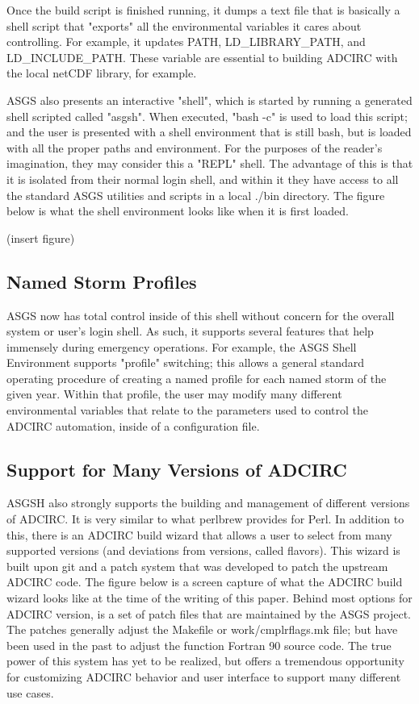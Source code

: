 \documentclass{article}
\begin{document}
Once the build script is finished running, it dumps a text file that is
basically a shell script that "exports" all the environmental variables it cares
about controlling. For example, it updates PATH, LD\_LIBRARY\_PATH, and
LD\_INCLUDE\_PATH. These variable are essential to building ADCIRC with the local
netCDF library, for example.

ASGS also presents an interactive "shell", which is started by running a
generated shell scripted called "asgsh". When executed, "bash -c" is used to
load this script; and the user is presented with a shell environment that is
still bash, but is loaded with all the proper paths and environment. For the
purposes of the reader's imagination, they may consider this a "REPL" shell. The
advantage of this is that it is isolated from their normal login shell, and
within it they have access to all the standard ASGS utilities and scripts in a
local ./bin directory. The figure below is what the shell environment looks like
when it is first loaded.

(insert figure)

\subsection{Named Storm Profiles}

ASGS now has total control inside of this shell without concern for the overall
system or user's login shell. As such, it supports several features that help
immensely during emergency operations. For example, the ASGS Shell Environment
supports "profile" switching; this allows a general standard operating procedure
of creating a named profile for each named storm of the given year. Within that
profile, the user may modify many different environmental variables that relate
to the parameters used to control the ADCIRC automation, inside of a
configuration file.

\subsection{Support for Many Versions of ADCIRC}

ASGSH also strongly supports the building and management of different versions
of ADCIRC. It is very similar to what perlbrew provides for Perl. In addition to
this, there is an ADCIRC build wizard that allows a user to select from many
supported versions (and deviations from versions, called flavors). This wizard
is built upon git and a patch system that was developed to patch the upstream
ADCIRC code. The figure below is a screen capture of what the ADCIRC build
wizard looks like at the time of the writing of this paper. Behind most options
for ADCIRC version, is a set of patch files that are maintained by the ASGS
project. The patches generally adjust the Makefile or work/cmplrflags.mk file;
but have been used in the past to adjust the function Fortran 90 source code.
The true power of this system has yet to be realized, but offers a tremendous
opportunity for customizing ADCIRC behavior and user interface to support many
different use cases.
\end{document}

